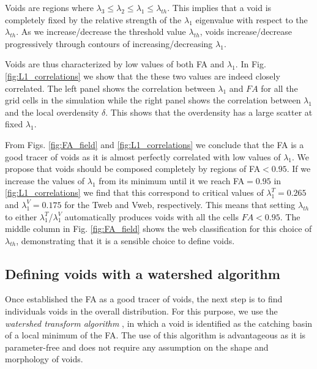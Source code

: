 \documentclass[a4,useAMS,usenatbib,usegraphicx]{latex/mn2e}
\begin{document}
Voids are regions where $\lambda_3\leq\lambda_2\leq
\lambda_1\leq\lambda_{th}$. 
This implies that a void is completely fixed by the relative strength
of the $\lambda_1$ eigenvalue with respect to the $\lambda_{th}$.   
As we  increase/decrease the threshold value $\lambda_{th}$, voids
increase/decrease progressively through contours of
increasing/decreasing $\lambda_1$.   
 
Voids are thus characterized by low values of both FA and
$\lambda_1$. 
In Fig. \ref{fig:L1_correlations} we show that the these two values
are indeed closely correlated.  
The left panel shows the correlation between $\lambda_1$ and $FA$ for
all the grid cells in the simulation while the right panel shows the
correlation between $\lambda_1$ and the local overdensity $\delta$.  
This shows that the overdensity has a large scatter at fixed
$\lambda_1$. 

From Figs. \ref{fig:FA_field} and \ref{fig:L1_correlations} we
conclude that the FA is a good tracer of voids as it is almost perfectly
correlated with low values of $\lambda_1$. 
We propose that voids should be composed completely by regions of
FA$<0.95$.
If we increase the values of $\lambda_1$ from its minimum until it
we reach FA$=0.95$ in \ref{fig:L1_correlations} we find that this
correspond to critical values of $\lambda_{1}^T = 0.265$ and
$\lambda_{1}^V = 0.175$ for the Tweb and Vweb, respectively.
This means that setting $\lambda_{th}$ to either
$\lambda_{1}^T$/$\lambda_{1}^{V}$ automatically produces voids with
all the cells $FA<0.95$.   
The middle column in Fig. \ref{fig:FA_field} shows the web
classification for this choice of $\lambda_{th}$, demonstrating that
it is a sensible choice to define voids. 

   
\subsection{Defining voids with a watershed algorithm}
\label{sec:watershed}


Once established the FA as a good tracer of voids, the next step is to
find individuals voids in the overall distribution. For this purpose, we
use the \textit{watershed transform algorithm} \citep{Beucher79,Beucher93}, 
in which a void is identified as the catching basin of a local minimum of
the FA. The use of this algorithm is advantageous as it is parameter-free 
and does not require any assumption on the shape and morphology of voids. 
\end{document}
